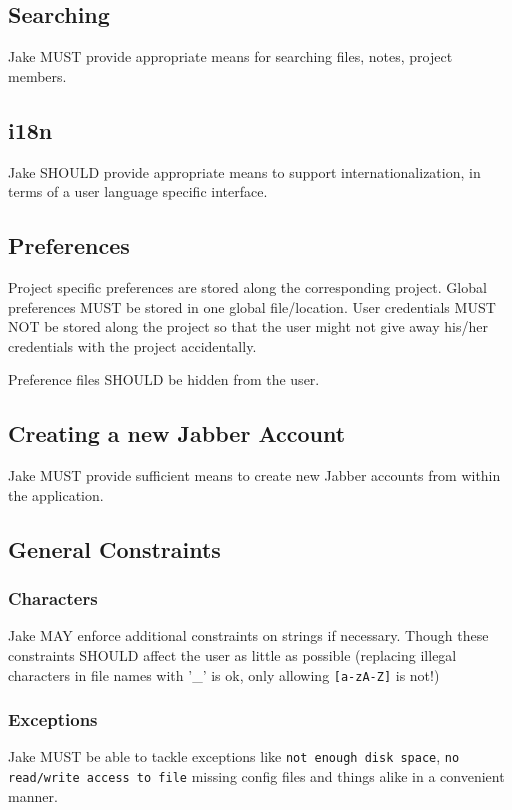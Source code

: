\subsection{Searching}
Jake MUST provide appropriate means for searching files, notes, project members.
\subsection{i18n}
Jake SHOULD provide appropriate means to support internationalization, in terms of a user language specific interface.

\subsection{Preferences}
Project specific preferences are stored along the corresponding project. Global preferences MUST be stored in one global file/location. User credentials MUST NOT be stored along the project so that the user might not give away his/her credentials with the project accidentally.

Preference files SHOULD be hidden from the user.

\subsection{Creating a new Jabber Account}
Jake MUST provide sufficient means to create new Jabber accounts from within the application.

\subsection{General Constraints}
\subsubsection{Characters}
Jake MAY enforce additional constraints on strings if necessary. Though these constraints SHOULD affect the user as little as possible (replacing illegal characters in file names with '\_' is ok, only allowing \texttt{[a-zA-Z]} is not!)

\subsubsection{Exceptions}
Jake  MUST be able to tackle exceptions like \texttt{not enough disk space}, \texttt{no read/write access to file} missing config files and things alike in a convenient manner. 

